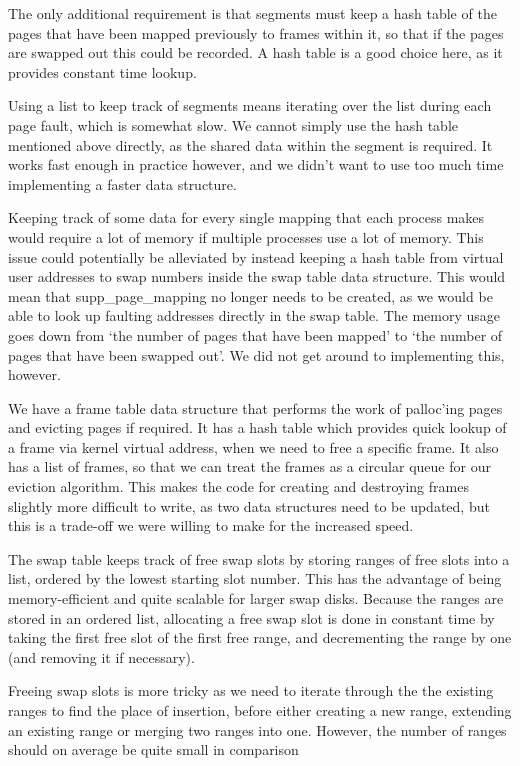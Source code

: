 The only additional requirement is that segments must keep a hash table of the
pages that have been mapped previously to frames within it, so that if the pages
are swapped out this could be recorded. A hash table is a good choice here, as
it provides constant time lookup.

Using a list to keep track of segments means iterating over the list during each
page fault, which is somewhat slow. We cannot simply use the hash table
mentioned above directly, as the shared data within the segment is required. It
works fast enough in practice however, and we didn't want to use too much time
implementing a faster data structure.

Keeping track of some data for every single mapping that each process makes
would require a lot of memory if multiple processes use a lot of memory. This
issue could potentially be alleviated by instead keeping a hash table from
virtual user addresses to swap numbers inside the swap table data
structure. This would mean that supp\_page\_mapping no longer needs to be
created, as we would be able to look up faulting addresses directly in the swap
table.  The memory usage goes down from `the number of pages that have been
mapped' to `the number of pages that have been swapped out'. We did not get
around to implementing this, however.

We have a frame table data structure that performs the work of palloc'ing pages
and evicting pages if required. It has a hash table which provides quick lookup
of a frame via kernel virtual address, when we need to free a specific frame. It
also has a list of frames, so that we can treat the frames as a circular queue for our eviction algorithm. This makes the code for creating and destroying frames
slightly more difficult to write, as two data structures need to be updated, but
this is a trade-off we were willing to make for the increased speed.

The swap table keeps track of free swap slots by storing ranges of free slots into a list, ordered by the lowest starting slot number. This has the advantage of being memory-efficient and quite scalable for larger swap disks. Because the ranges are stored in an ordered list, allocating a free swap slot is done in constant time by taking the first free slot of the first free range, and decrementing the range by one (and removing it if necessary).

Freeing swap slots is more tricky as we need to iterate through the the existing ranges to find the place of insertion, before either creating a new range, extending an existing range or merging two ranges into one. However, the number of ranges should on average be quite small in comparison

